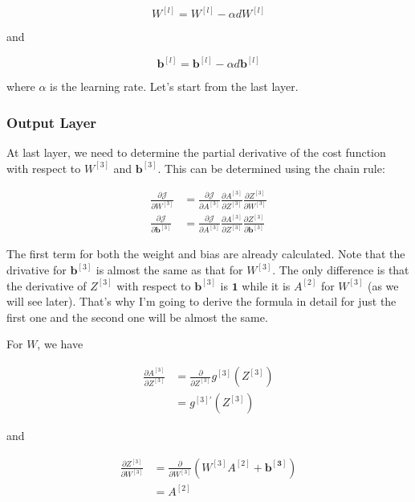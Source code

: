\documentclass[12pt]{article}
\begin{document}
$$
    W^{[l]} = W^{[l]} - \alpha d{W^{[l]}}
$$

and

$$
    \mathbf{b}^{[l]} = \mathbf{b}^{[l]} - \alpha d{\mathbf{b}^{[l]}}
$$

where \(\alpha\) is the learning rate. Let's start from the last layer.

\subsubsection{Output Layer}
At last layer, we need to determine the partial derivative of the cost function with respect to \(W^{[3]}\) and \(\mathbf{b}^{[3]}\). This can be determined using the chain rule:

$$
    \begin{aligned}
        \frac{\partial{\mathcal{J}}}{\partial W^{[3]}}          & = \frac{\partial{\mathcal{J}}}{\partial A^{[3]}} \frac{\partial{A^{[3]}}}{\partial Z^{[3]}} \frac{\partial{Z^{[3]}}}{\partial W^{[3]}}          \\
        \frac{\partial{\mathcal{J}}}{\partial \mathbf{b}^{[3]}} & = \frac{\partial{\mathcal{J}}}{\partial A^{[3]}} \frac{\partial{A^{[3]}}}{\partial Z^{[3]}} \frac{\partial{Z^{[3]}}}{\partial \mathbf{b}^{[3]}}
    \end{aligned}
$$

The first term for both the weight and bias are already calculated. Note that the drivative for $\mathbf{b}^{[3]}$ is almost the same as that for $W^{[3]}$. The only difference is that the derivative of $Z^{[3]}$ with respect to $\mathbf{b}^{[3]}$ is $\mathbf{1}$ while it is $A^{[2]}$ for $W^{[3]}$ (as we will see later). That's why I'm going to derive the formula in detail for just the first one and the second one will be almost the same.

For $W$, we have

$$
    \begin{aligned}
        \frac{\partial A^{[3]}}{\partial Z^{[3]}} & = \frac{\partial}{\partial Z^{[3]}} g^{[3]}(Z^{[3]}) \\
                                                  & = g^{[3]'}(Z^{[3]})
    \end{aligned}
$$

and

$$
    \begin{aligned}
        \frac{\partial Z^{[3]}}{\partial W^{[3]}} & = \frac{\partial}{\partial W^{[3]}} \left(W^{[3]} A^{[2]} + \mathbf{b^{[3]}} \right) \\
                                                  & = A^{[2]}
    \end{aligned}
$$
\end{document}
